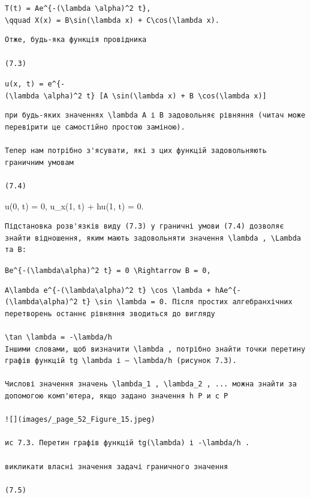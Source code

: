 \documentclass[
  ukrainian,
]{article}
\begin{document}
\texttt{T(t)\ =\ Ae\^{}\{-(\textbackslash{}lambda\ \textbackslash{}alpha)\^{}2\ t\},}
\texttt{\textbackslash{}qquad\ X(x)\ =\ B\textbackslash{}sin(\textbackslash{}lambda\ x)\ +\ C\textbackslash{}cos(\textbackslash{}lambda\ x).}

\begin{verbatim}
Отже, будь-яка функція провідника

(7.3)
\end{verbatim}

\texttt{u(x,\ t)\ =\ e\^{}\{-(\textbackslash{}lambda\ \textbackslash{}alpha)\^{}2\ t\}\ {[}A\ \textbackslash{}sin(\textbackslash{}lambda\ x)\ +\ B\ \textbackslash{}cos(\textbackslash{}lambda\ x){]}}

\begin{verbatim}
при будь-яких значеннях \lambda A і B задовольняє рівняння (читач може перевірити це самостійно простою заміною).

Тепер нам потрібно з'ясувати, які з цих функцій задовольняють граничним умовам

(7.4)
\end{verbatim}

u(0, t) = 0, u\_x(1, t) + hu(1, t) = 0.

\begin{verbatim}
Підстановка розв'язків виду (7.3) у граничні умови (7.4) дозволяє знайти відношення, яким мають задовольняти значення \lambda , \Lambda та B:
\end{verbatim}

\texttt{Be\^{}\{-(\textbackslash{}lambda\textbackslash{}alpha)\^{}2\ t\}\ =\ 0\ \textbackslash{}Rightarrow\ B\ =\ 0,}

\begin{verbatim}
A\lambda e^{-(\lambda\alpha)^2 t} \cos \lambda + hAe^{-(\lambda\alpha)^2 t} \sin \lambda = 0. Після простих алгебранхічних перетворень останнє рівняння зводиться до вигляду

\tan \lambda = -\lambda/h
Іншими словами, щоб визначити \lambda , потрібно знайти точки перетину графів функцій tg \lambda і — \lambda/h (рисунок 7.3).

Числові значення значень \lambda_1 , \lambda_2 , ... можна знайти за допомогою комп'ютера, якщо задано значення h Р и с Р

![](images/_page_52_Figure_15.jpeg)

ис 7.3. Перетин графів функцій tg(\lambda) і -\lambda/h .

викликати власні значення задачі граничного значення

(7.5)
\end{verbatim}
\end{document}
